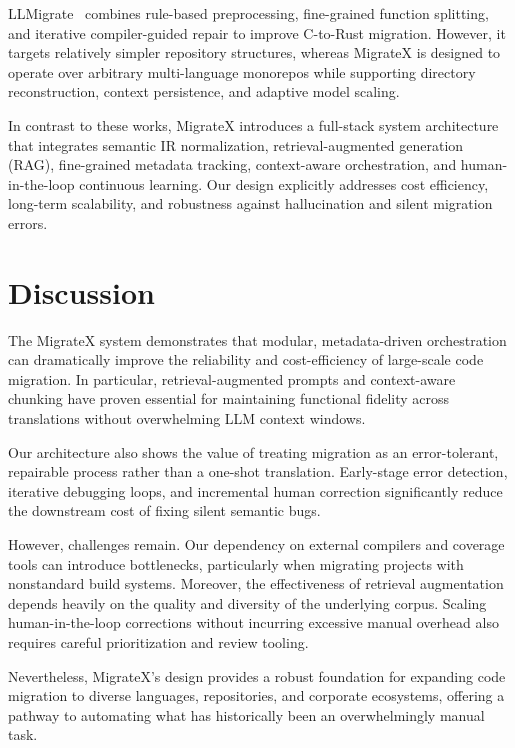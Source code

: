 \documentclass[twocolumn]{article}
\begin{document}
    LLMigrate~\cite{liu2025llmigrate} combines rule-based preprocessing, fine-grained function splitting, and iterative compiler-guided repair to improve C-to-Rust migration. However, it targets relatively simpler repository structures, whereas MigrateX is designed to operate over arbitrary multi-language monorepos while supporting directory reconstruction, context persistence, and adaptive model scaling.
    
    In contrast to these works, MigrateX introduces a full-stack system architecture that integrates semantic IR normalization, retrieval-augmented generation (RAG), fine-grained metadata tracking, context-aware orchestration, and human-in-the-loop continuous learning. Our design explicitly addresses cost efficiency, long-term scalability, and robustness against hallucination and silent migration errors.
        

    \section{Discussion}

The MigrateX system demonstrates that modular, metadata-driven orchestration can dramatically improve the reliability and cost-efficiency of large-scale code migration. In particular, retrieval-augmented prompts and context-aware chunking have proven essential for maintaining functional fidelity across translations without overwhelming LLM context windows.

Our architecture also shows the value of treating migration as an error-tolerant, repairable process rather than a one-shot translation. Early-stage error detection, iterative debugging loops, and incremental human correction significantly reduce the downstream cost of fixing silent semantic bugs.

However, challenges remain. Our dependency on external compilers and coverage tools can introduce bottlenecks, particularly when migrating projects with nonstandard build systems. Moreover, the effectiveness of retrieval augmentation depends heavily on the quality and diversity of the underlying corpus. Scaling human-in-the-loop corrections without incurring excessive manual overhead also requires careful prioritization and review tooling.

Nevertheless, MigrateX’s design provides a robust foundation for expanding code migration to diverse languages, repositories, and corporate ecosystems, offering a pathway to automating what has historically been an overwhelmingly manual task.
\end{document}
